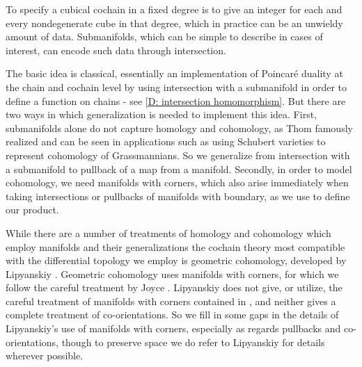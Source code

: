To specify a cubical  cochain in a fixed degree is to give an integer for each and every {nondegenerate cube} in that degree,
which in practice can be an unwieldy amount of data.
Submanifolds, which can be simple to describe in cases of interest, can encode such data through intersection.

The basic idea is classical, essentially an implementation of Poincar\'e duality at the chain and cochain level by using intersection with a
submanifold in order to define a function on chains - see \cref{D: intersection homomorphism}.
But there are two ways in which  generalization is needed to implement this idea.
First, submanifolds alone do not capture homology and cohomology, as Thom famously realized and can be
seen in applications such as using Schubert varieties to represent cohomology of Grassmannians.
So we generalize from intersection with a submanifold to pullback of a map from a manifold.
Secondly, in order to model cohomology, we need manifolds with corners, which also arise immediately when taking intersections or pullbacks of manifolds with boundary, as we use to define our product.

While there are a number of treatments of homology and cohomology which employ manifolds and their
generalizations \cite{Whit47, BRS76,  FeSj83, Krec10,  Kahn01, Zing08, Joyc15} the cochain theory most compatible with the differential topology we employ is geometric cohomology, developed by Lipyanskiy \cite{Lipy14}.
Geometric cohomology uses manifolds with corners, for which we follow the careful treatment by Joyce \cite{Joy12}.
Lipyanskiy does not give, or utilize, the careful treatment of manifolds with corners contained in \cite{Joy12}, and neither gives a complete treatment of co-orientations.
So we fill in some gaps in the details of Lipyanskiy's use of manifolds with corners, especially as regards pullbacks and co-orientations, though to preserve space we do refer to Lipyanskiy for details wherever possible.


